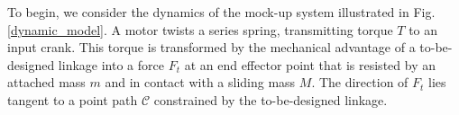 \documentclass[journal]{IEEEtran}
\begin{document}
To begin, we consider the dynamics of the mock-up system illustrated in Fig. \ref{dynamic_model}.
A motor twists a series spring, transmitting torque $T$ to an input crank.
This torque is transformed by the mechanical advantage of a to-be-designed linkage into a force $F_t$ at an end effector point that is resisted by an attached mass $m$ and in contact with a sliding mass $M$.
The direction of $F_t$ lies tangent to a point path $\mathcal{C}$ constrained by the to-be-designed linkage.


\begin{figure}[!b]
\centering
{}
\hfil
{}
\hfil
{}
\end{figure}
\end{document}
